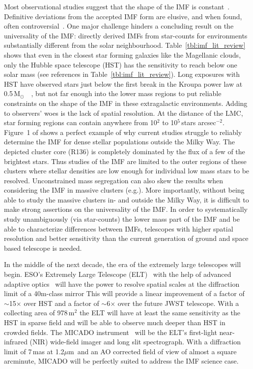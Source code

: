 \documentclass[referee]{aa}
\newcommand{\um}{$\mu$m~}
\newcommand{\msun}{M$_\odot$~}
\newcommand{\s}{$\sim$}
\newcommand{\h}[1]{$^{#1}$}
\newcommand{\spae}{stars arcsec$^{-2}$}
\begin{document}
Most observational studies suggest that the shape of the IMF is constant~\citep{Lada2003-ip,Kroupa2002,Bastian2010}.
Definitive deviations from the accepted IMF form are elusive, and when found, often controversial~\citep{Van_Dokkum2010-gx,Conroy2012-hv,Drass2016-kp}.
One major challenge hinders a concluding result on the universality of the IMF:  directly derived IMFs from star-counts for environments substantially different from the solar neighbourhood.
Table~\ref{tbl:imf_lit_review} shows that even in the closest star forming galaxies like the Magellanic clouds, only the Hubble space telescope (HST) has the sensitivity to reach below one solar mass (see references in Table~\ref{tbl:imf_lit_review}).
Long exposures with HST have observed stars just below the first break in the Kroupa power law at 0.5\,\msun~\citep{dario2009,kalirai2013,geha2013}, but not far enough into the lower mass regions to put reliable constraints on the shape of the IMF in these extragalactic environments.
Adding to observers' woes is the lack of spatial resolution.
At the distance of the LMC, star forming regions can contain anywhere from 10\h2 to 10\h5\,\spae.
Figure~1 of \citet{sirianni2000} shows a perfect example of why current studies struggle to reliably determine the IMF for dense stellar populations outside the Milky Way.
The depicted cluster core (R136) is completely dominated by the flux of a few of the brightest stars.
Thus studies of the IMF are limited to the outer regions of these clusters where stellar densities are low enough for individual low mass stars to be resolved.
Unconstrained mass segregation can also skew the results when considering the IMF in massive clusters (e.g.\~\citealt{Ascenso2009-de}).
More importantly, without being able to study the massive clusters in- and outside the Milky Way, it is difficult to make strong assertions on the universality of the IMF. In order to systematically study unambiguously (via star-counts) the lower mass part of the IMF and be able to characterize differences between IMFs, telescopes with higher spatial resolution and better sensitivity than the current generation of ground and space based telescope is needed.

In the middle of the next decade, the era of the extremely large telescopes will begin.
ESO's Extremely Large Telescope (ELT)~\citep{eelt} with the help of advanced adaptive optics~\citep{maory} will have the power to resolve spatial scales at the diffraction limit of a 40m-class mirror
This will provide a linear improvement of a factor of \s15$\times$ over HST and a factor of \s6$\times$ over the future JWST telescope.
With a collecting area of 978\,m\h2 the ELT will have at least the same sensitivity as the HST in sparse field and will be able to observe much deeper than HST in crowded fields.
The MICADO instrument~\citep{micado2016, micado2018} will be the ELT's first-light near-infrared (NIR) wide-field imager and long slit spectrograph.
With a diffraction limit of 7\,mas at 1.2\um and an AO corrected field of view of almost a square arcminute, MICADO will be perfectly suited to address the IMF science case.
\end{document}
